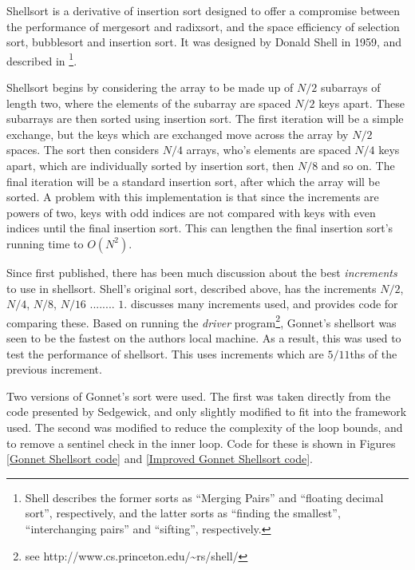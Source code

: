 \label{Shellsort}

Shellsort is a derivative of insertion sort designed to offer a compromise
between the performance of mergesort and radixsort, and the space efficiency of
selection sort, bubblesort and insertion sort. It was designed by Donald Shell
in 1959, and described in \cite{Shell59}\footnote{Shell describes the former
sorts as ``Merging Pairs'' and ``floating decimal sort'', respectively, and the
latter sorts as ``finding the smallest'', ``interchanging pairs'' and ``sifting'',
respectively.}.

Shellsort begins by considering the array to be made up of $N/2$ subarrays of
length two, where the elements of the subarray are spaced $N/2$ keys apart.
These subarrays are then sorted using insertion sort. The first iteration will
be a simple exchange, but the keys which are exchanged move across the array by
$N/2$ spaces. The sort then considers $N/4$ arrays, who's elements are spaced
$N/4$ keys apart, which are individually sorted by insertion sort, then $N/8$
and so on. The final iteration will be a standard insertion sort, after which
the array will be sorted. A problem with this implementation is that since the
increments are powers of two, keys with odd indices are not compared with keys
with even indices until the final insertion sort. This can lengthen the final
insertion sort's running time to $O(N^2)$.

Since first published, there has been much discussion about the best
\textit{increments} to use in shellsort. Shell's original sort, described above,
has the increments $N/2$, $N/4$, $N/8$, $N/16$ ........ $1$. \cite{Sedgewick96}
discusses many increments used, and provides code for comparing these. Based
on running the \textit{driver} program\footnote{see
http://www.cs.princeton.edu/\textasciitilde{}rs/shell/}, Gonnet's shellsort was
seen to be the fastest on the authors local machine. As a result, this was used
to test the performance of shellsort. This uses increments which are $5/11$ths
of the previous increment.

Two versions of Gonnet's sort were used. The first was taken directly from the
code presented by Sedgewick, and only slightly modified to fit into the framework used.
The second was modified to reduce the complexity of the loop bounds, and to
remove a sentinel check in the inner loop. Code for these is shown in Figures
\ref{Gonnet Shellsort code} and \ref{Improved Gonnet Shellsort code}.

